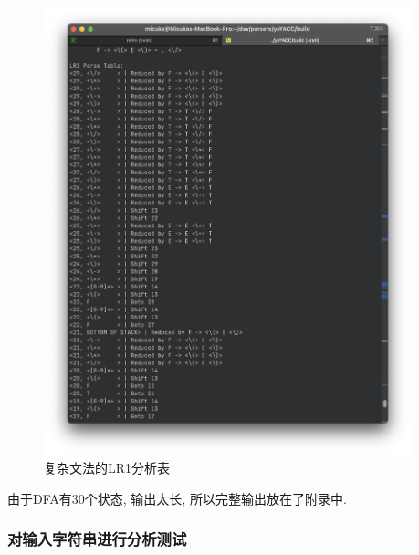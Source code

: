 \begin{figure}[ht!]
	\begin{center}
		\includegraphics[width=0.95\textwidth]{figures/lr1复杂分析表1.png}
	\end{center}
	\caption{复杂文法的LR1分析表}
	\label{fig:复杂文法的LR1分析表}
\end{figure}

由于DFA有30个状态, 输出太长, 所以完整输出放在了附录中.

\subsubsection{对输入字符串进行分析测试}

